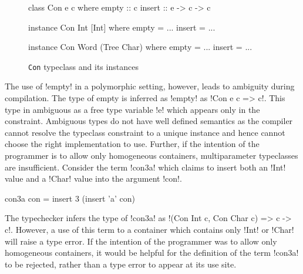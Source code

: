 \documentclass[screen,nonacm,manuscript,review]{acmart} %
\begin{document}
\begin{figure}[ht]
\centering
\begin{minipage}[ht]{0.3\linewidth}
\begin{CenteredBox}
\begin{code}
class Con e c
where
  empty :: c
  insert :: e -> c -> c
\end{code}
\end{CenteredBox}
\end{minipage}%
\begin{minipage}[ht]{0.3\linewidth}
\begin{CenteredBox}
\begin{code}
instance Con Int [Int]
where
  empty = ...
  insert = ...
\end{code}
\end{CenteredBox}
\end{minipage}%
\begin{minipage}[ht]{0.3\linewidth}
\begin{CenteredBox}
\begin{code}
instance Con Word (Tree Char)
where
  empty = ...
  insert = ...
\end{code}
\end{CenteredBox}
\end{minipage}
\caption[\lstinline{Con} typeclass]{\lstinline{Con} typeclass and its instances}
\label{fig:tc-collection}
\end{figure}

The use of !empty! in a polymorphic setting, however, leads to ambiguity during
compilation. The type of empty is inferred as !empty! as !Con e c => c!.  This type
in ambiguous as a free type variable !e! which appears only in the constraint.
Ambiguous types do not have well defined semantics as the compiler cannot
resolve the typeclass constraint to a unique instance and hence cannot
choose the right implementation to use. Further,
if the intention of the programmer is to allow only homogeneous containers,
multiparameter typeclasses are insufficient. Consider the term !con3a!
which claims to insert both an !Int! value and a !Char! value into
the argument !con!.

\begin{CenteredBox}
\begin{code}
con3a con = insert 3 (insert 'a' con)
\end{code}
\end{CenteredBox}

The typechecker infers the type of !con3a! as
!(Con Int c, Con Char c) => c -> c!. However, a use of this term
to a container which contains only !Int! or !Char! will raise a type error.
If the intention of the programmer was to allow only homogeneous containers,
it would be helpful for the definition of the term !con3a! to be rejected,
rather than a type error to appear at its use site.
\end{document}
